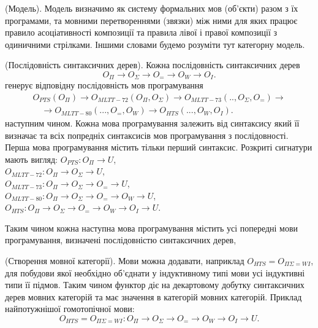 \begin{definition} (Модель).
Модель визначимо як систему формальних мов (об'єкти) разом з їх програмами,
та мовними перетвореннями (звязки) між ними для яких працює правило асоціативності
композиції та правила лівої і правої композиції з одиничними стрілками.
Іншими словами будемо розуміти тут категорну модель.
\end{definition}

\begin{definition} (Послідовність синтаксичних дерев). Кожна послідовність
синтаксичних дерев
\begin{equation}
O_{\Pi} \rightarrow O_{\Sigma} \rightarrow O_{=} \rightarrow O_{W} \rightarrow O_{I}.
\end{equation}
генерує відповідну послідовність мов програмування
\begin{equation}
\begin{split}
O_{PTS}(O_\Pi) \rightarrow O_{MLTT-72}(O_\Pi,O_\Sigma) \rightarrow O_{MLTT-73}(..,O_\Sigma,O_=) \rightarrow \\
 \quad \rightarrow O_{MLTT-80}(...,O_=,O_W) \rightarrow O_{HTS}(...,O_{W},O_I).
\end{split}
\end{equation}
наступним чином. Кожна мова програмування залежить
від синтаксису який її визначає
та всіх попредніх синтаксисів мов програмування з послідовності.
Перша мова програмування містить тільки перший синтаксис.
Розкриті сигнатури мають вигляд:
$O_{PTS}: O_\Pi \rightarrow U$, \\
$O_{MLTT-72}: O_\Pi \rightarrow O_\Sigma \rightarrow U$, \\
$O_{MLTT-73}: O_\Pi \rightarrow O_\Sigma \rightarrow O_= \rightarrow U$, \\
$O_{MLTT-80}: O_\Pi \rightarrow O_\Sigma \rightarrow O_= \rightarrow O_W \rightarrow U$, \\
$O_{HTS}: O_\Pi \rightarrow O_\Sigma \rightarrow O_= \rightarrow O_W \rightarrow O_I \rightarrow U$.
\end{definition}

Таким чином кожна наступна мова програмування містить усі попередні
мови програмування, визначені послідовністю синтаксичних дерев,

\begin{definition} (Створення мовної категорії).
Мови можна додавати, наприклад $O_{HTS} = O_{\Pi\Sigma=WI}$, для побудови якої необхідно
об'єднати у індуктивному типі мови усі індуктивні типи її підмов.
Таким чином функтор діє на декартовому добутку синтаксичних дерев мовних категорій
та має значення в категорій мовних категорій. Приклад найпотужнішої гомотопічної мови:
\begin{equation}
O_{HTS} = O_{\Pi\Sigma=WI} : O_\Pi \rightarrow O_\Sigma \rightarrow O_= \rightarrow O_W \rightarrow O_I \rightarrow U.
\end{equation}
\end{definition}

